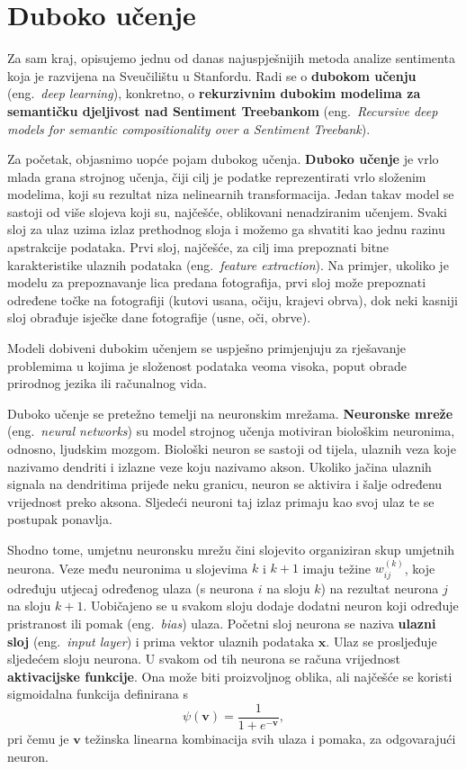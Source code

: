 \documentclass[a4paper,twoside,12pt]{memoir} %
\newcommand{\ti}[1]{\textit{#1\/}}
\newcommand{\tb}{\textbf}
\begin{document}
	\section{Duboko učenje}

	Za sam kraj, opisujemo jednu od danas najuspješnijih metoda analize sentimenta koja je razvijena na Sveučilištu u Stanfordu. Radi se o \tb{dubokom učenju} (eng.\ \ti{deep learning}), konkretno, o \tb{rekurzivnim dubokim modelima za se\-man\-ti\-čku djeljivost nad Sentiment Treebankom} (eng.~\ti{Recursive deep models for semantic compositionality over a Sentiment Treebank}).

	\bigskip

	Za početak, objasnimo uopće pojam dubokog učenja. \tb{Duboko učenje} je vrlo mlada grana strojnog učenja, čiji cilj je podatke reprezentirati vrlo složenim modelima, koji su rezultat niza nelinearnih transformacija. Jedan takav model se sastoji od više slojeva koji su, najčešće, oblikovani nenadziranim učenjem. Svaki sloj za ulaz uzima izlaz prethodnog sloja i možemo ga shvatiti kao jednu razinu apstrakcije podataka. Prvi sloj, najčešće, za cilj ima prepoznati bitne karakteristike ulaznih podataka (eng.~\ti{feature extraction}). Na primjer, ukoliko je modelu za prepoznavanje lica predana fotografija, prvi sloj može prepoznati određene točke na fotografiji (kutovi usana, očiju, krajevi obrva), dok neki kasniji sloj obrađuje isječke dane fotografije (usne, oči, obrve).

	Modeli dobiveni dubokim učenjem se uspješno primjenjuju za rješavanje problemima u kojima je složenost podataka veoma visoka, poput obrade prirodnog jezika ili računalnog vida.

	\bigskip

	Duboko učenje se pretežno temelji na neuronskim mrežama. \tb{Neuronske mre\-že} (eng.~\ti{neural networks}) su model strojnog učenja motiviran biološkim neuronima, odnosno, ljudskim mozgom. Biološki neuron se sastoji od tijela, ulaznih veza koje nazivamo dendriti i izlazne veze koju nazivamo akson. Ukoliko jačina ulaznih signala na dendritima prijeđe neku granicu, neuron se aktivira i šalje određenu vrijednost preko aksona. Sljedeći neuroni taj izlaz primaju kao svoj ulaz te se postupak ponavlja.

	Shodno tome, umjetnu neuronsku mrežu čini slojevito organiziran skup umjetnih neurona. Veze među neuronima u slojevima $k$ i $k + 1$ imaju težine $w_{ij}^{(k)}$, koje određuju utjecaj određenog ulaza (s neurona $i$ na sloju $k$) na rezultat neurona $j$ na sloju $k + 1$. Uobičajeno se u svakom sloju dodaje dodatni neuron koji određuje pristranost ili pomak (eng.~\ti{bias}) ulaza. Početni sloj neurona se naziva \tb{ulazni sloj} (eng.~\ti{input layer}) i prima vektor ulaznih podataka $\mathbf{x}$. Ulaz se prosljeđuje sljedećem sloju neurona. U svakom od tih neurona se računa vrijednost \tb{aktivacijske funkcije}. Ona može biti proizvoljnog oblika, ali najčešće se koristi sigmoidalna funkcija definirana s
	\begin{equation*}
	\psi(\mathbf{v}) = \frac{1}{1+e^{-\mathbf{v}}},
	\end{equation*}
	pri čemu je $\mathbf{v}$ težinska linearna kombinacija svih ulaza i pomaka, za odgovarajući neuron.
\end{document}
